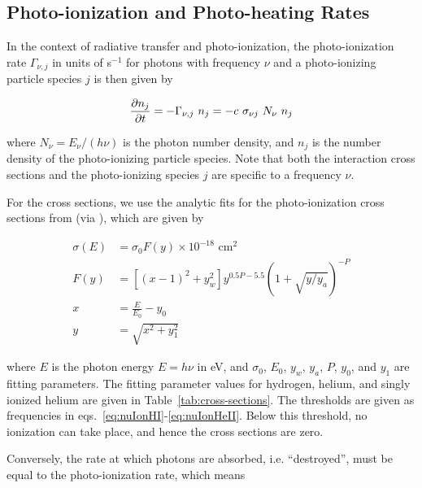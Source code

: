 \subsection{Photo-ionization and Photo-heating Rates}


In the context of radiative transfer and photo-ionization, the photo-ionization rate $\Gamma_{\nu,
j}$ in units of s$^{-1}$ for photons with frequency $\nu$ and a photo-ionizing particle species $j$
is then given by

\begin{align}
   \DELDT{n_j} = -\Gamma_{\nu, j} \ n_j = - c \ \sigma_{\nu j} \ N_\nu \ n_j
\end{align}

where $N_\nu = E_\nu / (h \nu)$ is the photon number density, and $n_j$ is the number density of
the photo-ionizing particle species. Note that both the interaction cross sections  and the
photo-ionizing species $j$ are specific to a frequency $\nu$.

For the cross sections, we use the analytic fits for the photo-ionization cross sections from
\cite{vernerAtomicDataAstrophysics1996} (via \cite{ramses-rt13}), which are given by

\begin{align}
\sigma(E) &= \sigma_0 F(y) \times 10^{-18} \text{ cm}^2  \label{eq:sigma-parametrizaiton}
\\
F(y) &= \left[(x - 1)^2 + y_w^2 \right] y ^{0.5 P - 5.5} \left( 1 + \sqrt{y / y_a} \right)^{-P}
\\
x &= \frac{E}{E_0} - y_0 \\
y &= \sqrt{x^2 + y_1^2}
\end{align}

where $E$ is the photon energy $E = h \nu$ in eV, and $\sigma_0$, $E_0$, $y_w$, $y_a$, $P$, $y_0$,
and $y_1$ are fitting parameters. The fitting parameter values for hydrogen, helium, and singly
ionized helium are given in Table~\ref{tab:cross-sections}. The thresholds are given as frequencies
in eqs.~\ref{eq:nuIonHI}-\ref{eq:nuIonHeII}. Below this threshold, no ionization can take place, and
hence the cross sections are zero.









Conversely, the rate at which photons are absorbed, i.e. ``destroyed'',  must be equal to the
photo-ionization rate, which means

